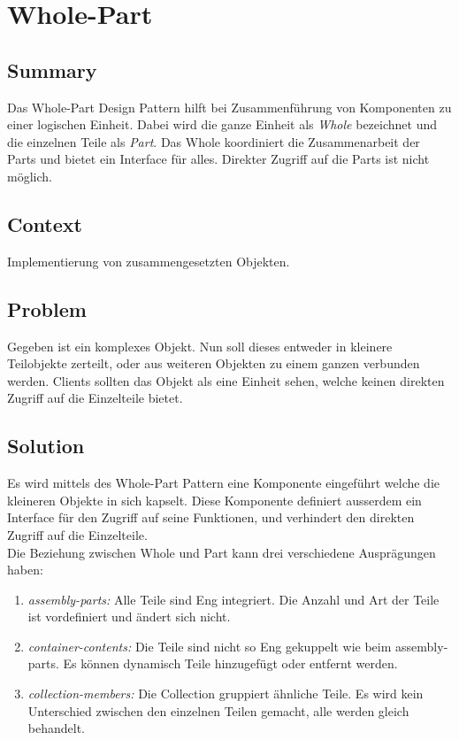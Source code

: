 \chapter{Whole-Part}

\section{Summary}
Das Whole-Part Design Pattern hilft bei Zusammenführung von Komponenten zu einer logischen Einheit. Dabei wird die ganze Einheit als \textit{Whole} bezeichnet und die einzelnen Teile als \textit{Part}. Das Whole koordiniert die Zusammenarbeit der Parts und bietet ein Interface für alles. Direkter Zugriff auf die Parts ist nicht möglich.
\section{Context}
Implementierung von zusammengesetzten Objekten.
\section{Problem}
Gegeben ist ein komplexes Objekt. Nun soll dieses entweder in kleinere Teilobjekte zerteilt, oder aus weiteren Objekten zu einem ganzen verbunden werden. Clients sollten das Objekt als eine Einheit sehen, welche keinen direkten Zugriff auf die Einzelteile bietet.
\section{Solution}
Es wird mittels des Whole-Part Pattern eine Komponente eingeführt welche die kleineren Objekte in sich kapselt. Diese Komponente definiert ausserdem ein Interface für den Zugriff auf seine Funktionen, und verhindert den direkten Zugriff auf die Einzelteile.  \\
Die Beziehung zwischen Whole und Part kann drei verschiedene Ausprägungen haben:
\begin{enumerate}
	\item \textit{assembly-parts:} Alle Teile sind Eng integriert. Die Anzahl und Art der Teile ist vordefiniert und ändert sich nicht.
	\item \textit{container-contents:} Die Teile sind nicht so Eng gekuppelt wie beim assembly-parts. Es können dynamisch Teile hinzugefügt oder entfernt werden.
	\item \textit{collection-members:} Die Collection gruppiert ähnliche Teile. Es wird kein Unterschied zwischen den einzelnen Teilen gemacht, alle werden gleich behandelt.
\end{enumerate}
